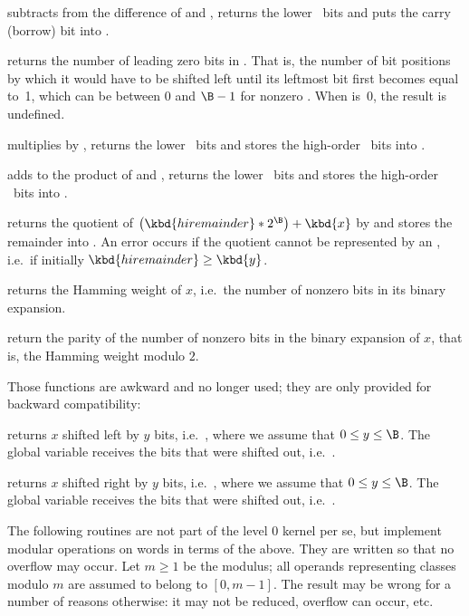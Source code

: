  subtracts  from the
difference of  and , returns the lower \B\ bits and puts the
carry (borrow) bit into .

 returns the number of leading zero bits in .
That is, the number of bit positions by which it would have to be shifted
left until its leftmost bit first becomes equal to~1, which can be between 0
and $\B-1$ for nonzero . When  is~0, the result is undefined.

 multiplies  by , returns
the lower \B\ bits and stores the high-order \B\ bits into .

 adds  to the product
of  and , returns the lower \B\ bits and stores the high-order
\B\ bits into .

 returns the quotient of
$  \left(\kbd{hiremainder} * 2^{\B}\right) + \kbd{x} $
by  and stores the remainder into . An error occurs
if the quotient cannot be represented by an , i.e.~if initially
$\kbd{hiremainder}\ge\kbd{y}$.

 returns the Hamming weight of $x$, i.e.~the
number of nonzero bits in its binary expansion.

 return the parity of the number of nonzero bits
in the binary expansion of $x$, that is, the Hamming weight modulo $2$.

 Those functions are awkward and no longer used;
they are only provided for backward compatibility:

 returns $x$ shifted left by $y$ bits,
i.e.~, where we assume that $0\leq y\leq\B$. The global variable
 receives the bits that were shifted out,
i.e.~.

 returns $x$ shifted right by $y$ bits,
i.e.~, where we assume that $0\leq y\leq\B$. The global variable
 receives the bits that were shifted out,
i.e.~.

The following routines are not part of the level 0 kernel per se, but
implement modular operations on words in terms of the above. They are written
so that no overflow may occur. Let $m \geq 1$ be the modulus; all operands
representing classes modulo $m$ are assumed to belong to $[0,m-1]$. The
result may be wrong for a number of reasons otherwise: it may not be reduced,
overflow can occur, etc.

